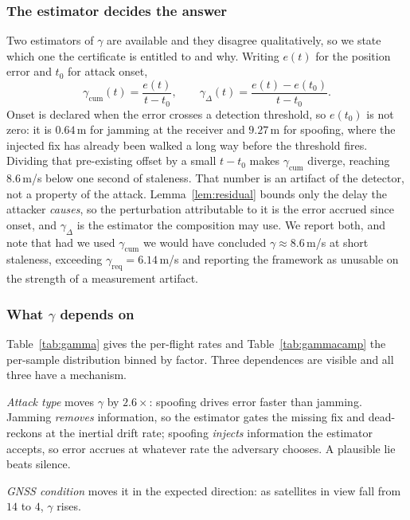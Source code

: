 \subsubsection{The estimator decides the answer}
Two estimators of $\gamma$ are available and they disagree qualitatively, so we
state which one the certificate is entitled to and why. Writing $e(t)$ for the
position error and $t_0$ for attack onset,
\begin{equation}
\label{eq:gammaest}
\gamma_{\mathrm{cum}}(t)=\frac{e(t)}{t-t_0},
\qquad
\gamma_{\Delta}(t)=\frac{e(t)-e(t_0)}{t-t_0}.
\end{equation}
Onset is declared when the error crosses a detection threshold, so $e(t_0)$ is
not zero: it is $0.64$\,m for jamming at the receiver and $9.27$\,m for
spoofing, where the injected fix has already been walked a long way before the
threshold fires. Dividing that pre-existing offset by a small $t-t_0$ makes
$\gamma_{\mathrm{cum}}$ diverge, reaching $8.6$\,m/s below one second of
staleness. That number is an artifact of the detector, not a property of the
attack. Lemma~\ref{lem:residual} bounds only the delay the attacker
\emph{causes}, so the perturbation attributable to it is the error accrued since
onset, and $\gamma_{\Delta}$ is the estimator the composition may use. We report
both, and note that had we used $\gamma_{\mathrm{cum}}$ we would have concluded
$\gamma\approx8.6$\,m/s at short staleness, exceeding
$\gamma_{\mathrm{req}}=6.14$\,m/s and reporting the framework as unusable on the
strength of a measurement artifact.

\subsubsection{What $\gamma$ depends on}
Table~\ref{tab:gamma} gives the per-flight rates and
Table~\ref{tab:gammacamp} the per-sample distribution binned by factor. Three
dependences are visible and all three have a mechanism.

\emph{Attack type} moves $\gamma$ by $2.6\times$: spoofing drives error faster
than jamming. Jamming \emph{removes} information, so the estimator gates the
missing fix and dead-reckons at the inertial drift rate; spoofing \emph{injects}
information the estimator accepts, so error accrues at whatever rate the
adversary chooses. A plausible lie beats silence.

\emph{GNSS condition} moves it in the expected direction: as satellites in view
fall from $14$ to $4$, $\gamma$ rises.

